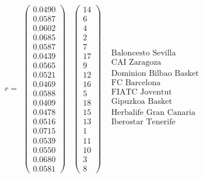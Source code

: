 	\[r=
	\begin{array}{ccc}
	\left(\begin{array}{c}
    0.0490\\
    0.0587\\
    0.0602\\
    0.0685\\
    0.0587\\
    0.0439\\
    0.0565\\
    0.0521\\
    0.0469\\
    0.0588\\
    0.0409\\
    0.0478\\
    0.0516\\
    0.0715\\
    0.0539\\
    0.0550\\
    0.0680\\
    0.0581
	\end{array} \right) & \left(\begin{array}{c}
    14\\
    6\\
    4\\
    2\\
    7\\
    17\\
    9\\
    12\\
    16\\
    5\\
    18\\
    15\\
    13\\
    1\\
    11\\
    10\\
    3\\
    8
	\end{array} \right) & \begin{array}{c}
	\text{Baloncesto Sevilla}\\
	\text{CAI Zaragoza} \\
	\text{Dominion Bilbao Basket} \\
	\text{FC Barcelona} \\
	\text{FIATC Joventut} \\
	\text{Gipuzkoa Basket} \\
	\text{Herbalife Gran Canaria} \\
	\text{Iberostar Tenerife} \\

\end{array}
\end{array}\]
